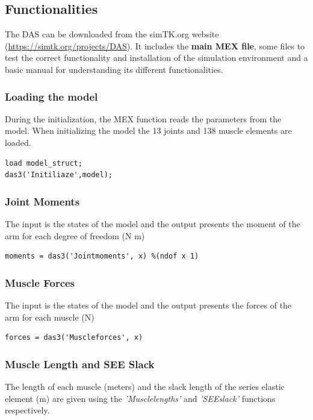 \subsection{Functionalities}

The \ac{DAS} can be downloaded from the simTK.org website (\href{https://simtk.org/projects/\ac{DAS}}{https://simtk.org/projects/\ac{DAS}}). It includes the \textbf{main MEX file}, some files to test the correct functionality and installation of the simulation environment and a basic manual for understanding its different functionalities. 

\subsubsection{Loading the model}

During the initialization, the MEX function reads the parameters from the model. When initializing the model the 13 joints and 138 muscle elements are loaded.

\begin{lstlisting}[style=Matlab-editor]
load model_struct;
das3('Initiliaze',model);
\end{lstlisting}
\subsubsection{Joint Moments}
The input is the states of the model and the output presents the moment of the arm for each degree of freedom (N m)
\begin{lstlisting}[style=Matlab-editor]
moments = das3('Jointmoments', x) %(ndof x 1)
\end{lstlisting}

\subsubsection{Muscle Forces}
The input is the states of the model and the output presents the forces of the arm for each muscle (N)
\begin{lstlisting}[style=Matlab-editor]
forces = das3('Muscleforces', x)
\end{lstlisting}

\subsubsection{Muscle Length and SEE Slack}
The length of each muscle (meters) and the slack length of the series elastic element (m) are given using the \textit{'Musclelengths'} and \textit{'SEEslack'} functions respectively. 

